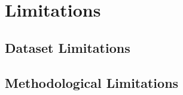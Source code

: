 %
%
%
%


\section{Limitations}
\label{sec:discuss_limitations}



\subsection{Dataset Limitations}
\label{subsec:discuss_limit_dataset}

%
%
%
%
%


\subsection{Methodological Limitations}
\label{subsec:discuss_limit_methods}

%
%
%
%


